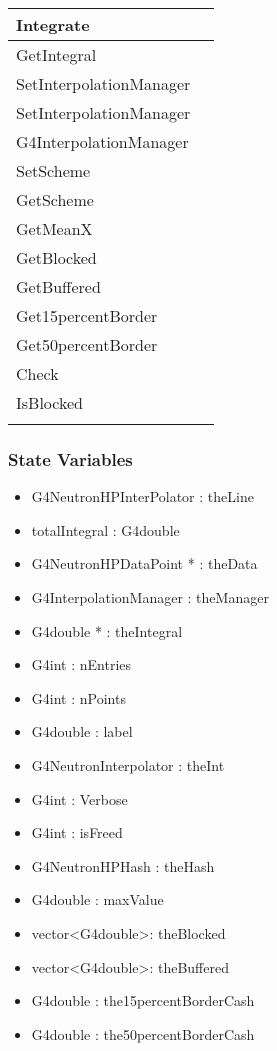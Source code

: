 \documentclass[12pt]{article}
\begin{document}
\begin{longtable}{p{}p{}}
Integrate & \\\hline
GetIntegral & \\\hline
SetInterpolationManager & \\\hline
SetInterpolationManager & \\\hline
G4InterpolationManager & \\\hline
SetScheme & \\\hline
GetScheme & \\\hline
GetMeanX & \\\hline
GetBlocked & \\\hline
GetBuffered & \\\hline
Get15percentBorder & \\\hline
Get50percentBorder & \\\hline
Check & \\\hline
IsBlocked & \\
\arrayrulecolor{black}
\bottomrule
\end{longtable}

\subsubsection{State Variables}%
\begin{itemize}
\item G4NeutronHPInterPolator : theLine
\item totalIntegral : G4double
\item G4NeutronHPDataPoint * : theData
\item G4InterpolationManager : theManager
\item G4double * : theIntegral
\item G4int : nEntries
\item G4int : nPoints
\item G4double : label
\item G4NeutronInterpolator : theInt
\item G4int : Verbose
\item G4int : isFreed
\item G4NeutronHPHash : theHash
\item G4double : maxValue
\item vector\textless G4double\textgreater : theBlocked
\item vector\textless G4double\textgreater : theBuffered
\item G4double : the15percentBorderCash
\item G4double : the50percentBorderCash
\end{itemize}
\end{document}
